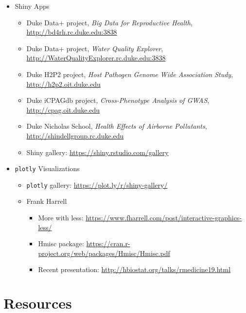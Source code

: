 \documentclass[10pt, letterpaper]{article}
\begin{document}
\begin{spacing}{1.0}
\begin{itemize}[noitemsep]
  \item Shiny Apps
    \begin{itemize}[noitemsep]
        \item Duke Data+ project, \textit{Big Data for Reproductive Health}, \url{http://bd4rh.rc.duke.edu:3838}
        \item Duke Data+ project, \textit{Water Quality Explorer}, \small  \url{http://WaterQualityExplorer.rc.duke.edu:3838} \normalsize
        \item Duke H2P2 project, \textit{Host Pathogen Genome Wide Association Study}, \small \url{http://h2p2.oit.duke.edu} \normalsize
        \item Duke iCPAGdb project, \textit{Cross-Phenotype Analysis of GWAS}, \url{http://cpag.oit.duke.edu}
        \item Duke Nicholas School, \textit{Health Effects of Airborne Pollutants}, \small \url{http://shindellgroup.rc.duke.edu} \normalsize
        \item Shiny gallery:  \url{https://shiny.rstudio.com/gallery}
    \end{itemize}  \item \texttt{plotly} Visualizations
    \begin{itemize}
      \item \texttt{plotly} gallery:  \url{https://plot.ly/r/shiny-gallery/}
      \item Frank Harrell
        \begin{itemize}
          \item More with less:  \url{https://www.fharrell.com/post/interactive-graphics-less/}
          \item Hmisc package:  \url{https://cran.r-project.org/web/packages/Hmisc/Hmisc.pdf}
          \item Recent presentation:  \url{http://hbiostat.org/talks/rmedicine19.html}
        \end{itemize}
    \end{itemize}
\end{itemize}



\section{Resources}\label{sec:resources}

\begin{itemize}


\end{itemize}
\end{spacing}
\end{document}
